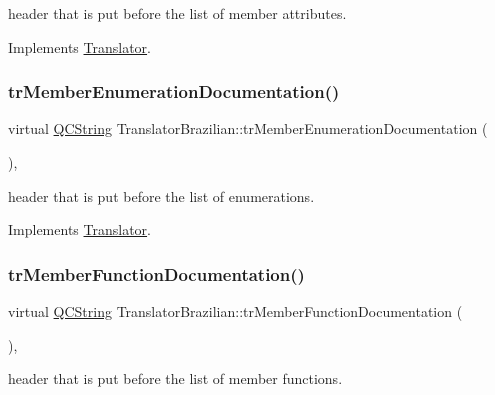 header that is put before the list of member attributes. 

Implements \mbox{\hyperlink{class_translator}{Translator}}.

\mbox{\label{class_translator_brazilian_ae4273c630cb4f3ac18a0d1c8c8176f69}} 
\subsubsection{\texorpdfstring{trMemberEnumerationDocumentation()}{trMemberEnumerationDocumentation()}}
{\footnotesize\ttfamily virtual \mbox{\hyperlink{class_q_c_string}{Q\+C\+String}} Translator\+Brazilian\+::tr\+Member\+Enumeration\+Documentation (\begin{DoxyParamCaption}{ }\end{DoxyParamCaption})\hspace{0.3cm}{\ttfamily [inline]}, {\ttfamily [virtual]}}

header that is put before the list of enumerations. 

Implements \mbox{\hyperlink{class_translator}{Translator}}.

\mbox{\label{class_translator_brazilian_aab0b01c256c2d695889bcd3312084358}} 
\subsubsection{\texorpdfstring{trMemberFunctionDocumentation()}{trMemberFunctionDocumentation()}}
{\footnotesize\ttfamily virtual \mbox{\hyperlink{class_q_c_string}{Q\+C\+String}} Translator\+Brazilian\+::tr\+Member\+Function\+Documentation (\begin{DoxyParamCaption}{ }\end{DoxyParamCaption})\hspace{0.3cm}{\ttfamily [inline]}, {\ttfamily [virtual]}}

header that is put before the list of member functions. 

